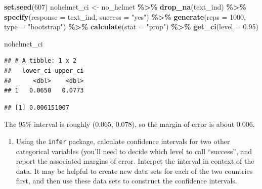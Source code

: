 \documentclass[
]{article}
\newenvironment{Shaded}{\begin{snugshade}}{\end{snugshade}}
\newcommand{\AttributeTok}[1]{\textcolor[rgb]{0.13,0.29,0.53}{#1}}
\newcommand{\DecValTok}[1]{\textcolor[rgb]{0.00,0.00,0.81}{#1}}
\newcommand{\FloatTok}[1]{\textcolor[rgb]{0.00,0.00,0.81}{#1}}
\newcommand{\FunctionTok}[1]{\textcolor[rgb]{0.13,0.29,0.53}{\textbf{#1}}}
\newcommand{\NormalTok}[1]{#1}
\newcommand{\OtherTok}[1]{\textcolor[rgb]{0.56,0.35,0.01}{#1}}
\newcommand{\SpecialCharTok}[1]{\textcolor[rgb]{0.81,0.36,0.00}{\textbf{#1}}}
\newcommand{\StringTok}[1]{\textcolor[rgb]{0.31,0.60,0.02}{#1}}
\providecommand{\tightlist}{%
  \setlength{\itemsep}{0pt}\setlength{\parskip}{0pt}}
\begin{document}
\begin{Shaded}
\begin{Highlighting}[]
\FunctionTok{set.seed}\NormalTok{(}\DecValTok{607}\NormalTok{)}
\NormalTok{nohelmet\_ci }\OtherTok{\textless{}{-}}\NormalTok{ no\_helmet }\SpecialCharTok{\%\textgreater{}\%}
  \FunctionTok{drop\_na}\NormalTok{(text\_ind) }\SpecialCharTok{\%\textgreater{}\%}
  \FunctionTok{specify}\NormalTok{(}\AttributeTok{response =}\NormalTok{ text\_ind, }\AttributeTok{success =} \StringTok{"yes"}\NormalTok{) }\SpecialCharTok{\%\textgreater{}\%}
  \FunctionTok{generate}\NormalTok{(}\AttributeTok{reps =} \DecValTok{1000}\NormalTok{, }\AttributeTok{type =} \StringTok{"bootstrap"}\NormalTok{) }\SpecialCharTok{\%\textgreater{}\%}
  \FunctionTok{calculate}\NormalTok{(}\AttributeTok{stat =} \StringTok{"prop"}\NormalTok{) }\SpecialCharTok{\%\textgreater{}\%}
  \FunctionTok{get\_ci}\NormalTok{(}\AttributeTok{level =} \FloatTok{0.95}\NormalTok{)}

\NormalTok{nohelmet\_ci}
\end{Highlighting}
\end{Shaded}

\begin{verbatim}
## # A tibble: 1 x 2
##   lower_ci upper_ci
##      <dbl>    <dbl>
## 1   0.0650   0.0773
\end{verbatim}

\begin{Shaded}
\end{Shaded}

\begin{verbatim}
## [1] 0.006151007
\end{verbatim}

The 95\% interval is roughly (0.065, 0.078), so the margin of error is
about 0.006.

\begin{enumerate}
\def\labelenumi{\arabic{enumi}.}
\setcounter{enumi}{3}
\tightlist
\item
  Using the \texttt{infer} package, calculate confidence intervals for
  two other categorical variables (you'll need to decide which level to
  call ``success'', and report the associated margins of error. Interpet
  the interval in context of the data. It may be helpful to create new
  data sets for each of the two countries first, and then use these data
  sets to construct the confidence intervals.
\end{enumerate}
\end{document}
